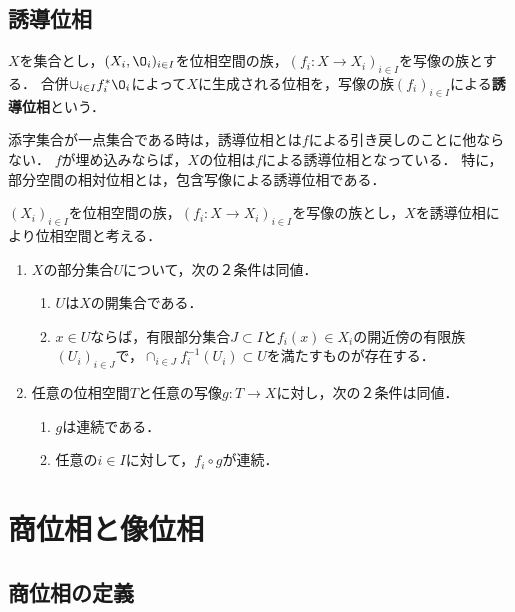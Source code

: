 \documentclass[uplatex,dvipdfmx]{jsreport}
\begin{document}
\subsection{誘導位相}

\begin{definition}
    $X$を集合とし，$(X_i,\O_i)_{i\in I}$を位相空間の族，$(f_i:X\to X_i)_{i\in I}$を写像の族とする．
    合併$\cup_{i\in I}f^*_i\O_i$によって$X$に生成される位相を，写像の族$(f_i)_{i\in I}$による\textbf{誘導位相}という．
\end{definition}
\begin{remark}
    添字集合が一点集合である時は，誘導位相とは$f$による引き戻しのことに他ならない．
    $f$が埋め込みならば，$X$の位相は$f$による誘導位相となっている．
    特に，部分空間の相対位相とは，包含写像による誘導位相である．
\end{remark}

\begin{proposition}[誘導位相の普遍性]\label{prop-universality-of-final-topology}
    $(X_i)_{i\in I}$を位相空間の族，$(f_i:X\to X_i)_{i\in I}$を写像の族とし，$X$を誘導位相により位相空間と考える．
    \begin{enumerate}
        \item $X$の部分集合$U$について，次の２条件は同値．
        \begin{enumerate}[(1)]
            \item $U$は$X$の開集合である．
            \item $x\in U$ならば，有限部分集合$J\subset I$と$f_i(x)\in X_i$の開近傍の有限族$(U_i)_{i\in J}$で，$\cap_{i\in J}f^{-1}_i(U_i)\subset U$を満たすものが存在する．
        \end{enumerate}
        \item 任意の位相空間$T$と任意の写像$g:T\to X$に対し，次の２条件は同値．
        \begin{enumerate}[(1)]
            \item $g$は連続である．
            \item 任意の$i\in I$に対して，$f_i\circ g$が連続．
        \end{enumerate}
    \end{enumerate}
\end{proposition}

\section{商位相と像位相}

\subsection{商位相の定義}
\end{document}
